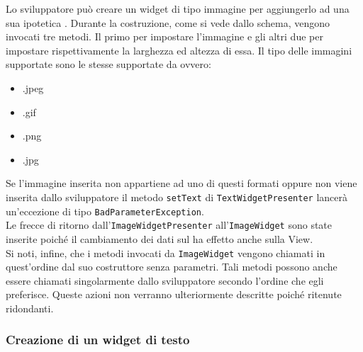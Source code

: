 Lo sviluppatore può creare un widget di tipo immagine per aggiungerlo ad una sua ipotetica . Durante la costruzione, come si vede dallo schema, vengono invocati tre metodi. Il primo per impostare l'immagine e gli altri due per impostare rispettivamente la larghezza ed altezza di essa. Il tipo delle immagini supportate sono le stesse supportate da  ovvero:
\begin{itemize}
\item .jpeg
\item .gif
\item .png
\item .jpg
\end{itemize}
Se l'immagine inserita non appartiene ad uno di questi formati oppure non viene inserita dallo sviluppatore il metodo \texttt{setText} di \texttt{TextWidgetPresenter} lancerà un'eccezione di tipo \texttt{BadParameterException}. \\
Le frecce di ritorno dall'\texttt{ImageWidgetPresenter} all'\texttt{ImageWidget} sono state inserite poiché il cambiamento dei dati sul  ha effetto anche sulla View. \\
Si noti, infine, che i metodi invocati da \texttt{ImageWidget} vengono chiamati in quest'ordine dal suo costruttore senza parametri. Tali metodi possono anche essere chiamati singolarmente dallo sviluppatore secondo l'ordine che egli preferisce. Queste azioni non verranno ulteriormente descritte poiché ritenute ridondanti.

\newpage

\subsubsection{Creazione di un widget di testo}

